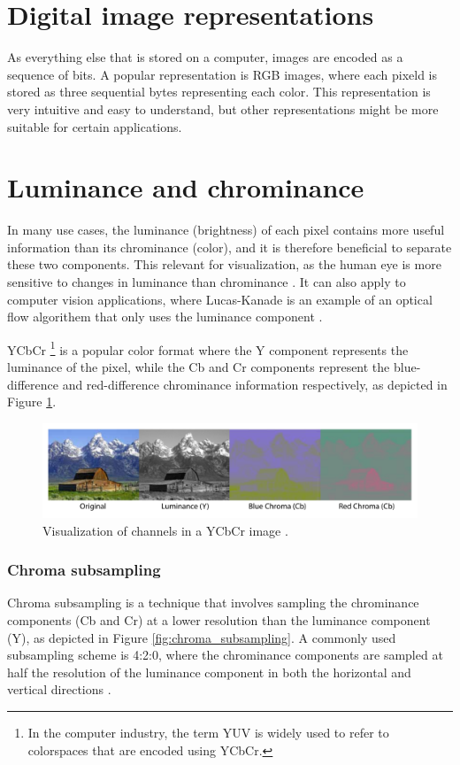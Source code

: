 \section{Digital image representations}
As everything else that is stored on a computer, images are encoded as a sequence of bits.
A popular representation is RGB images, where each pixeld is stored as three sequential bytes representing each color.
This representation is very intuitive and easy to understand, but other representations might be more suitable for certain applications.

\section{Luminance and chrominance}
In many use cases, the luminance (brightness) of each pixel contains more useful information than its chrominance (color), and it is therefore beneficial to separate these two components.
This relevant for visualization, as the human eye is more sensitive to changes in luminance than chrominance  \cite{lambWhyRodsCones2016}.
It can also apply to computer vision applications, where Lucas-Kanade is an example of an optical flow algorithem that only uses the luminance component \cite{lucasIterativeImageRegistration1981}.

YCbCr
\footnote{In the computer industry, the term YUV is widely used to refer to colorspaces that are encoded using YCbCr.}
is a popular color format where the Y component represents the luminance of the pixel, while the Cb and Cr components represent the blue-difference and red-difference chrominance information respectively, as depicted in Figure \ref{fig:ycbcr_example}.

\begin{figure}[H]
    \centering
    \includegraphics[width=\textwidth]{figures/debayer/YCbCr_example.pdf}
    \caption{Visualization of channels in a YCbCr image \cite{photoEnglishJohnMoulton2004}.}
    \label{fig:ycbcr_example}
\end{figure}

\subsubsection{Chroma subsampling}
Chroma subsampling is a technique that involves sampling the chrominance components (Cb and Cr) at a lower resolution than the luminance component (Y), as depicted in Figure \ref{fig:chroma_subsampling}.
A commonly used subsampling scheme is 4:2:0, where the chrominance components are sampled at half the resolution of the luminance component in both the horizontal and vertical directions \cite{ChromaSubsampling2023}.

